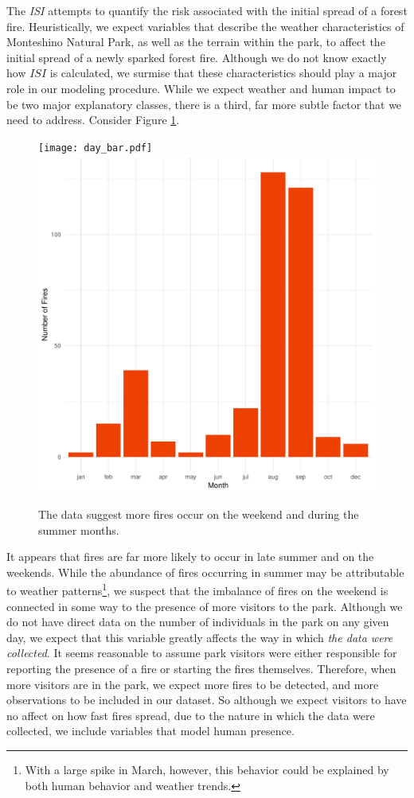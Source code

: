 \documentclass{article}
\begin{document}
The \textit{ISI} attempts to quantify the risk associated with the initial spread of a forest fire. Heuristically, we expect variables that describe the weather characteristics of Monteshino Natural Park, as well as the terrain within the park, to affect the initial spread of a newly sparked forest fire. Although we do not know exactly how $\textit{ISI}$ is calculated, we surmise that these characteristics should play a major role in our modeling procedure. While we expect weather and human impact to be two major explanatory classes, there is a third, far more subtle factor that we need to address. Consider Figure \ref{fig:human_factor}. 
\begin{figure}[h!]
\centering
\texttt{[image: day\_bar.pdf]}
\includegraphics[scale = .25]{month_bar.pdf}
\caption{The data suggest more fires occur on the weekend and during the summer months.}
\label{fig:human_factor}{}
\end{figure}
It appears that fires are far more likely to occur in late summer and on the weekends. While the abundance of fires occurring in summer may be attributable to weather patterns\footnote{With a large spike in March, however, this behavior could be explained by both human behavior and weather trends.}, we suspect that the imbalance of fires on the weekend is connected in some way to the presence of more visitors to the park. Although we do not have direct data on the number of individuals in the park on any given day, we expect that this variable greatly affects the way in which \textit{the data were collected}. It seems reasonable to assume park visitors were either responsible for reporting the presence of a fire or starting the fires themselves. Therefore, when more visitors are in the park, we expect more fires to be detected, and more observations to be included in our dataset. So although we expect visitors to have no affect on how fast fires spread, due to the nature in which the data were collected, we include variables that model human presence.  
\end{document}
